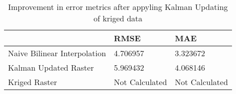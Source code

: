 \begin{table}
\caption{Improvement in error metrics after appyling Kalman Updating of kriged data}
\label{tab:Oahu8_lidar_error}
\begin{tabular}{lll}
\toprule
 & RMSE & MAE \\
\midrule
Naive Bilinear Interpolation & 4.706957 & 3.323672 \\
Kalman Updated Raster & 5.969432 & 4.068146 \\
Kriged Raster & Not Calculated & Not Calculated \\
\bottomrule
\end{tabular}
\end{table}

